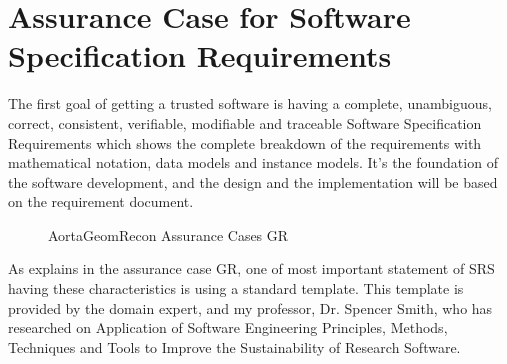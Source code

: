 \section{Assurance Case for Software Specification Requirements}

The first goal of getting a trusted software is having a complete, unambiguous, correct, consistent, verifiable, modifiable and traceable Software Specification Requirements \citep{SRS} which shows the complete breakdown of the requirements with mathematical notation, data models and instance models. It's the foundation of the software development, and the design and the implementation will be based on the requirement document.


\begin{figure}[H]
    \centering
    \caption[AortaGeomRecon Assurance Cases GR]{AortaGeomRecon Assurance Cases GR}
    \label{fig_agr_ac_gr}
\end{figure}



As explains in the assurance case GR, one of  most important statement of SRS having these characteristics is using a standard template. This template is provided by the domain expert, and my professor, Dr. Spencer Smith, who has researched on Application of Software Engineering Principles, Methods, Techniques and Tools to Improve the Sustainability of Research Software.

